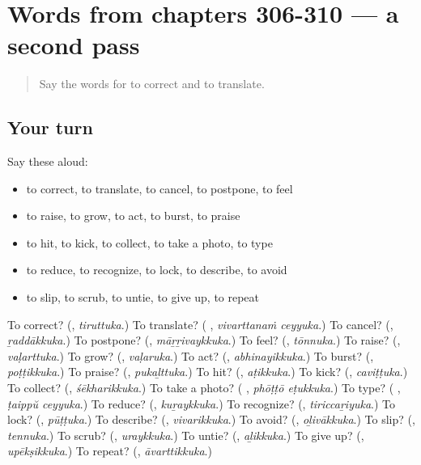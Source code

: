 \section[(dialogue)]{Words from chapters 306-310 — a second pass}

\label{lesson:ML-R310-second-pass-words-from-chapters-306-310}



\begin{quote}
Say the words for to correct and to translate.
\end{quote}

\subsection*{Your turn}
Say these aloud:

\begin{itemize}
\raggedright
  \item to correct, to translate, to cancel, to postpone, to feel
  \item to raise, to grow, to act, to burst, to praise
  \item to hit, to kick, to collect, to take a photo, to type
  \item to reduce, to recognize, to lock, to describe, to avoid
  \item to slip, to scrub, to untie, to give up, to repeat
\end{itemize}

\begin{tcolorbox}[breakable,colback=teal!4,colframe=teal!35!black,title={Before you move on}]
To correct? (\textbf{}, \emph{tiruttuka}.) To translate? (\textbf{ }, \emph{vivarttanaṁ ceyyuka}.) To cancel? (\textbf{}, \emph{ṟaddākkuka}.) To postpone? (\textbf{}, \emph{māṟṟivaykkuka}.) To feel? (\textbf{}, \emph{tōnnuka}.) To raise? (\textbf{}, \emph{vaḷarttuka}.) To grow? (\textbf{}, \emph{vaḷaruka}.) To act? (\textbf{}, \emph{abhinayikkuka}.) To burst? (\textbf{}, \emph{poṭṭikkuka}.) To praise? (\textbf{}, \emph{pukaḻttuka}.) To hit? (\textbf{}, \emph{aṭikkuka}.) To kick? (\textbf{}, \emph{caviṭṭuka}.) To collect? (\textbf{}, \emph{śēkharikkuka}.) To take a photo? (\textbf{ }, \emph{phōṭṭō eṭukkuka}.) To type? (\textbf{ }, \emph{ṭaippŭ ceyyuka}.) To reduce? (\textbf{}, \emph{kuṟaykkuka}.) To recognize? (\textbf{}, \emph{tiriccaṟiyuka}.) To lock? (\textbf{}, \emph{pūṭṭuka}.) To describe? (\textbf{}, \emph{vivarikkuka}.) To avoid? (\textbf{}, \emph{oḻivākkuka}.) To slip? (\textbf{}, \emph{tennuka}.) To scrub? (\textbf{}, \emph{uraykkuka}.) To untie? (\textbf{}, \emph{aḻikkuka}.) To give up? (\textbf{}, \emph{upēkṣikkuka}.) To repeat? (\textbf{}, \emph{āvarttikkuka}.)
\end{tcolorbox}
